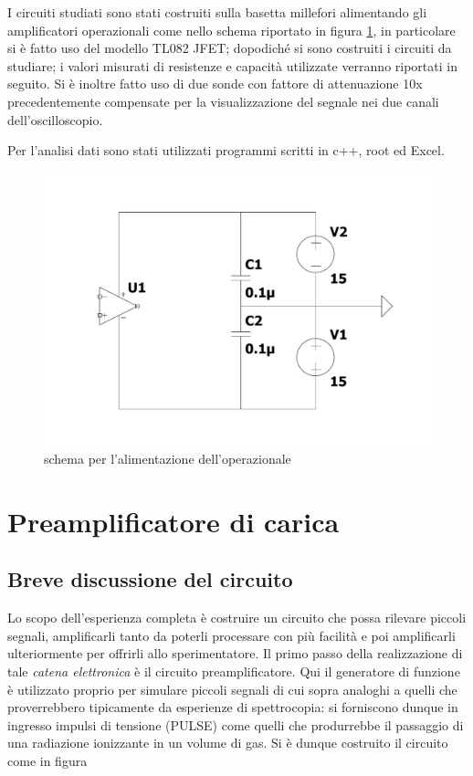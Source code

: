 \documentclass{article}
\begin{document}
I circuiti studiati sono stati costruiti sulla basetta millefori alimentando gli amplificatori operazionali come nello schema riportato 
in figura \ref{fig:alimentazione}, in particolare si è fatto uso del modello TL082 JFET; dopodiché si sono 
costruiti i circuiti da studiare;  i valori misurati di resistenze e capacità utilizzate verranno riportati in seguito.
Si è inoltre fatto uso di due sonde con fattore di attenuazione 10x precedentemente compensate per la visualizzazione del 
segnale nei due canali dell'oscilloscopio.

Per l'analisi dati sono stati utilizzati programmi scritti in c++, root ed Excel.

\begin{center}
\begin{figure}[H]
\centering
\includegraphics[scale=0.28, angle=0]{alimentazione.pdf}
\caption{ schema per l'alimentazione dell'operazionale }
\label{fig:alimentazione}
\end{figure}
\end{center} 

\section{Preamplificatore di carica}

\subsection{Breve discussione del circuito}

Lo scopo dell'esperienza completa è costruire un circuito che possa rilevare piccoli segnali, amplificarli tanto da poterli processare con più facilità
e poi amplificarli ulteriormente per offrirli allo sperimentatore. Il primo passo della realizzazione di tale \textit{catena elettronica} è il circuito
preamplificatore. Qui il generatore di funzione è utilizzato proprio per simulare piccoli segnali di cui sopra analoghi a quelli che proverrebbero tipicamente 
da esperienze di spettrocopia: si forniscono dunque in ingresso impulsi di tensione (PULSE) come quelli che produrrebbe il passaggio di una radiazione ionizzante in 
un volume di gas. 
Si è dunque costruito il circuito come in figura
\end{document}
